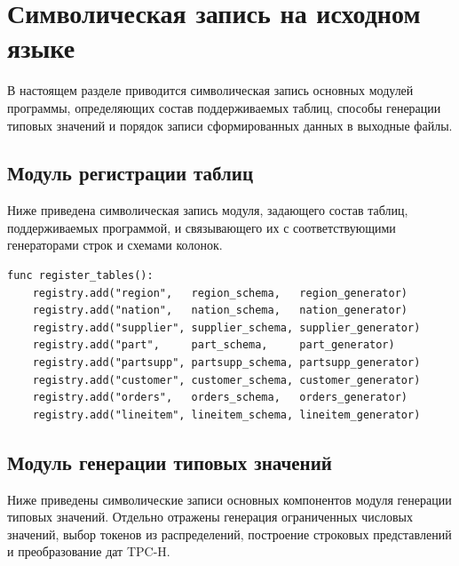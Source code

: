 \section{Символическая запись на исходном языке}

В настоящем разделе приводится символическая запись основных модулей программы,
определяющих состав поддерживаемых таблиц, способы генерации типовых значений и
порядок записи сформированных данных в выходные файлы.

\subsection{Модуль регистрации таблиц}

Ниже приведена символическая запись модуля, задающего состав таблиц,
поддерживаемых программой, и связывающего их с соответствующими генераторами
строк и схемами колонок.

\begin{lstlisting}[caption={Регистрация таблиц генератора}]
func register_tables():
    registry.add("region",   region_schema,   region_generator)
    registry.add("nation",   nation_schema,   nation_generator)
    registry.add("supplier", supplier_schema, supplier_generator)
    registry.add("part",     part_schema,     part_generator)
    registry.add("partsupp", partsupp_schema, partsupp_generator)
    registry.add("customer", customer_schema, customer_generator)
    registry.add("orders",   orders_schema,   orders_generator)
    registry.add("lineitem", lineitem_schema, lineitem_generator)
\end{lstlisting}

\subsection{Модуль генерации типовых значений}

Ниже приведены символические записи основных компонентов модуля генерации
типовых значений. Отдельно отражены генерация ограниченных числовых значений,
выбор токенов из распределений, построение строковых представлений и
преобразование дат TPC-H.

